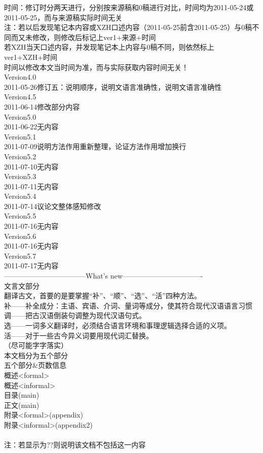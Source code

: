 时间：修订时分两天进行，分别按来源稿和0稿进行对比，时间均为2011-05-24或2011-05-25，而与来源稿实际时间无关\\
注：若以后发现笔记本内容或XZH口述内容（2011-05-25前含2011-05-25）与0稿不同而又未修改，则修改后标记上ver1+来源+时间\\
若XZH当天口述内容，并发现笔记本上内容与0稿不同，则依然标上ver1+XZH+时间\\
时间以修改本文当时间为准，而与实际获取内容时间无关！\\
Version4.0\\
2011-05-26修订五：说明顺序，说明文语言准确性，说明文语言准确性\\
Version4.5\\
2011-06-14修改部分内容\\%
Version5.0\\
2011-06-22无内容\\%
Version5.1\\
2011-07-09说明方法作用重新整理，论证方法作用增加换行\\
Version5.2\\
2011-07-10无内容\\%
Version5.3\\
2011-07-11无内容\\%
Version5.4\\
2011-07-14议论文整体感知修改\\
Version5.5\\
2011-07-16无内容\\%
Version5.6\\
2011-07-16无内容\\%
Version5.7\\
2011-07-17无内容\\%
-----------------------------------What's new----------------------------------\\
文言文部分\\
翻译古文，首要的是要掌握“补”、“顺”、“选”、“活”四种方法。\\
补——补全成分：主语、宾语、介词、量词等成分，使其符合现代汉语语言习惯\\
调——把古汉语倒装句调整为现代汉语句式。\\
选——一词多义翻译时，必须结合语言环境和事理逻辑选择合适的义项。\\
活——对于一些古今异义词要用现代词汇替换。\\
（尽可能字字落实）
\\
本文档分为五个部分\\
五个部分\&页数信息\\
概述<formal>\pageref{abstractformal}\\
概述<informal>\pageref{abstractinformal}\\
目录(main)\pageref{contents}\\
正文(main)\pageref{main}\\
附录<formal>(appendix)\pageref{appendixformal}\\
附录<informal>(appendix2)\pageref{appendix}\\
\\
注：若显示为??则说明该文档不包括这一内容\label{appendixformal} \\
\\ 